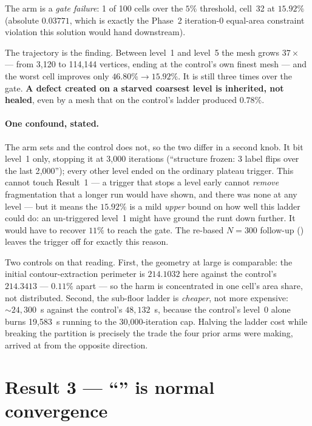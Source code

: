 \documentclass[11pt,a4paper]{article}
\begin{document}
The arm is a \emph{gate failure}: 1 of 100 cells over the \(5\%\) threshold,
cell~32 at \(15.92\%\) (absolute \(0.03771\), which is exactly the Phase~2
iteration-0 equal-area constraint violation this solution would hand downstream).

The trajectory is the finding. Between level~1 and level~5 the mesh grows
\(37\times\) --- from 3{,}120 to 114{,}144 vertices, ending at the control's own
finest mesh --- and the worst cell improves only \(46.80\% \to 15.92\%\). It is
still three times over the gate. \textbf{A defect created on a starved coarsest
level is inherited, not healed}, even by a mesh that on the control's ladder
produced \(0.78\%\).

\paragraph{One confound, stated.} The arm sets
 and the control does not, so the two differ
in a second knob. It bit level~1 only, stopping it at 3{,}000 iterations
(``structure frozen: 3 label flips over the last 2{,}000''); every other level
ended on the ordinary plateau trigger. This cannot touch Result~1 --- a trigger
that stops a level early cannot \emph{remove} fragmentation that a longer run
would have shown, and there was none at any level --- but it means the
\(15.92\%\) is a mild \emph{upper} bound on how well this ladder could do: an
un-triggered level~1 might have ground the runt down further. It would have to
recover \(11\%\) to reach the gate. The re-based \(N{=}300\) follow-up
() leaves the trigger
off for exactly this reason.

Two controls on that reading. First, the geometry at large is comparable: the
initial contour-extraction perimeter is \(214.1032\) here against the control's
\(214.3413\) --- \(0.11\%\) apart --- so the harm is concentrated in one cell's
area share, not distributed. Second, the sub-floor ladder is \emph{cheaper}, not
more expensive: \(\sim\!24{,}300\)~s against the control's \(48{,}132\)~s, because
the control's level~0 alone burns 19{,}583~s running to the 30{,}000-iteration
cap. Halving the ladder cost while breaking the partition is precisely the
trade the four prior arms were making, arrived at from the opposite direction.

\section{Result 3 --- ``'' is normal convergence}
\label{sec:stall}
\end{document}

